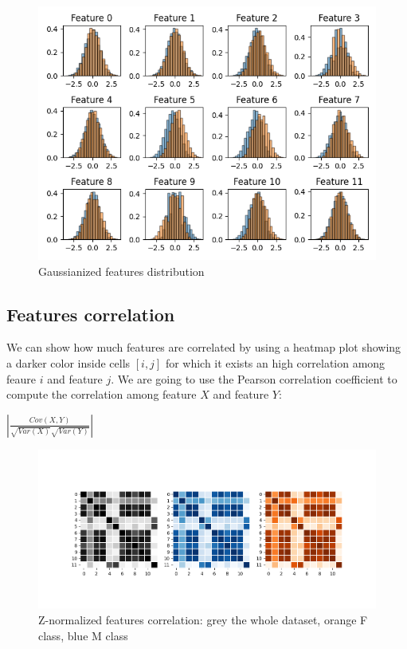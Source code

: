 \documentclass[10pt, a4paper, twocolumn]{article} %
\begin{document}
\begin{figure}[ht!]
	\includegraphics[width=\linewidth]{./Pictures/FeaturesAnalysis/hist_gau.png}
	\caption{Gaussianized features distribution}
	\label{hist_gau} 
\end{figure}
\subsection{Features correlation}
We can show how much features are correlated by using a heatmap plot showing a darker
color inside cells $[i, j]$ for which it exists an high correlation among feaure $i$ and 
feature $j$. We are going to use the Pearson correlation coefficient to compute the
correlation among feature $X$ and feature $Y$:
\begin{center}
	\begin{math}
		|\frac{Cov(X, Y)}{\sqrt{Var(X)}\sqrt{Var(Y)}}|
	\end{math}
\end{center}
\begin{figure}[ht!]
	\includegraphics[width=\linewidth]{./Pictures/FeaturesAnalysis/heatmap_znorm.png}
	\caption{Z-normalized features correlation: grey the whole dataset, orange F class, 
	blue M class}
	\label{heatmap} 
\end{figure}
\end{document}
